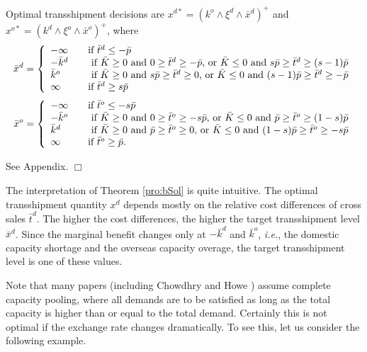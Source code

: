 \documentclass[mnsc,nonblindrev,copyedit]{informs2_wz} %
\newcommand{\proof}{\noindent{\bf Proof: } }
\newcommand{\qed}{ \hfill $\Box$ }
\begin{document}
{\theorem Optimal transshipment decisions are $x^{d*} = (k^o\wedge \xi^d \wedge \bar{x}^d)^+$ and $x^{o*} = (k^d\wedge \xi^o \wedge \bar{x}^o)^+$, where
\begin{eqnarray}
\bar{x}^d= \left\{
  \begin{array} {ll}
  -\infty  \quad & \mbox {if $\bar{t}^d \leq -\bar{p}$}\\
  -\bar{k}^d  \quad & \mbox{ if $\bar{K} \geq 0$ and $0 \geq \bar{t}^d
  \geq -\bar{p}$, or $\bar{K} \leq 0$ and $ s\bar{p} \geq
  \bar{t}^d \geq (s-1) \bar{p}$} \\
\bar{k}^o  \quad  & \mbox{ if $\bar{K} \geq 0$ and $s\bar{p} \geq
\bar{t}^d \geq 0$, or $\bar{K} \leq 0$ and $  (s-1) \bar{p}\geq
  \bar{t}^d \geq -\bar{p}$}\\
  \infty \quad &\mbox {if $\bar{t}^d \geq s\bar{p}$}
  \end{array} \right.
\end{eqnarray}
\begin{eqnarray} \bar{x}^o= \left\{
  \begin{array} {ll}
  -\infty \quad & \mbox {if $\bar{t}^o \leq -s\bar{p}$}\\
  -\bar{k}^o \quad & \mbox{ if $\bar{K} \geq 0$ and $0 \geq
  \bar{t}^o
  \geq -s\bar{p}$, or $\bar{K} \leq 0$ and $ \bar{p} \geq
  \bar{t}^o \geq (1-s) \bar{p}$} \\
\bar{k}^d  \quad  & \mbox{ if $\bar{K} \geq 0$ and $\bar{p} \geq
\bar{t}^o \geq 0$, or $\bar{K} \leq 0$ and $  (1-s) \bar{p}\geq
  \bar{t}^o \geq -s\bar{p}$}\\
  \infty \quad &\mbox {if $\bar{t}^o \geq \bar{p}$.}
  \end{array} \right.
\end{eqnarray}
\label{pro:bSol}}

\proof See Appendix. \qed

The interpretation of Theorem \ref{pro:bSol} is quite intuitive.  The optimal transshipment quantity $x^d$ depends mostly on the relative cost differences of cross sales $ \bar{t}^d$.  The higher the cost differences, the higher the target transshipment level $\bar{x}^d$.  Since the marginal benefit changes only at $-\bar{k}^d$ and $\bar{k}^o$, {\it i.e.}, the domestic capacity shortage and the overseas capacity overage, the target transshipment level is one of these values.

Note that many papers (including Chowdhry and Howe \cite{Chowdhry1999}) assume complete capacity pooling, where all demands are to be satisfied as long as the total capacity is higher than or equal to the total demand.  Certainly this is not optimal if the exchange rate changes dramatically.  To see this, let us consider the following example.
\end{document}
